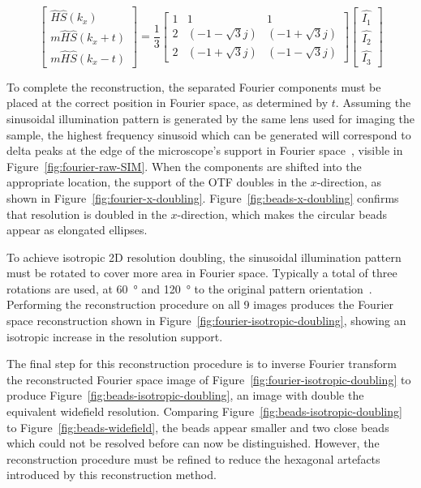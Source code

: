 \begin{equation} \label{eq:matrix-solved}
\begin{bmatrix} \hat{H}\hat{S}\left(k_x\right) \\ m\hat{H}\hat{S}\left(k_x+t\right) \\ m\hat{H}\hat{S}\left(k_x-t\right) \end{bmatrix} =
\frac{1}{3} \begin{bmatrix}
1 & 1 & 1 \\
2 & \left(-1 -\sqrt{3}j\right) & \left(-1+\sqrt{3}j\right) \\
2 & \left(-1 +\sqrt{3}j\right) & \left(-1 -\sqrt{3}j\right)
\end{bmatrix}
\begin{bmatrix} \hat{I_1} \\ \hat{I_2} \\ \hat{I_3} \end{bmatrix}
\end{equation}

To complete the reconstruction, the separated Fourier components must be placed at the correct position in Fourier space, as determined by $t$.
Assuming the sinusoidal illumination pattern is generated by the same lens used for imaging the sample, the highest frequency sinusoid which can be generated will correspond to delta peaks at the edge of the microscope's support in Fourier space~\cite{heintzmann2017super}, visible in Figure~\ref{fig:fourier-raw-SIM}.
When the components are shifted into the appropriate location, the support of the OTF doubles in the $x$-direction, as shown in Figure~\ref{fig:fourier-x-doubling}.
Figure~\ref{fig:beads-x-doubling} confirms that resolution is doubled in the $x$-direction, which makes the circular beads appear as elongated ellipses.

To achieve isotropic 2D resolution doubling, the sinusoidal illumination pattern must be rotated to cover more area in Fourier space.
Typically a total of three rotations are used, at \SI{60}{\degree} and \SI{120}{\degree} to the original pattern orientation~\cite{gustafsson2000surpassing, chang2009isotropic}.
Performing the reconstruction procedure on all 9 images produces the Fourier space reconstruction shown in Figure~\ref{fig:fourier-isotropic-doubling}, showing an isotropic increase in the resolution support.


The final step for this reconstruction procedure is to inverse Fourier transform the reconstructed Fourier space image of Figure~\ref{fig:fourier-isotropic-doubling} to produce Figure~\ref{fig:beads-isotropic-doubling}, an image with double the equivalent widefield resolution.
Comparing Figure~\ref{fig:beads-isotropic-doubling} to Figure~\ref{fig:beads-widefield}, the beads appear smaller and two close beads which could not be resolved before can now be distinguished.
However, the reconstruction procedure must be refined to reduce the hexagonal artefacts introduced by this reconstruction method.


